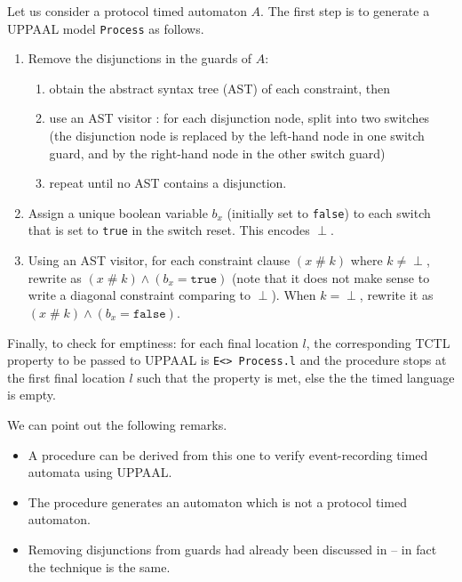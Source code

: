 \begin{procedure}
Let us consider a protocol timed automaton $A$. The first step is to generate a UPPAAL model \texttt{Process} as follows.
\begin{enumerate}

	\item Remove the disjunctions in the guards of $A$:
	\begin{enumerate}
		\item obtain the abstract syntax tree (AST) of each constraint, then
		\item use an AST visitor \cite{Gamma95}: for each disjunction node, split into two switches (the disjunction node is replaced by the left-hand node in one switch guard, and by the right-hand node in the other switch guard)
		\item repeat until no AST contains a disjunction.
	\end{enumerate}
	
	\item Assign a unique boolean variable $b_x$ (initially set to \texttt{false}) to each switch that is set to \texttt{true} in the switch reset. This encodes $\perp$.
	
	\item Using an AST visitor, for each constraint clause $(x \;\#\; k)$ where $k \neq \perp$, rewrite as $(x \;\#\; k) \wedge (b_x = \mathtt{true})$ (note that it does not make sense to write a diagonal constraint comparing to $\perp$). When $k = \perp$, rewrite it as $(x \;\#\; k) \wedge (b_x = \mathtt{false})$.

\end{enumerate}

Finally, to check for emptiness: for each final location $l$, the corresponding TCTL property to be passed to UPPAAL is \texttt{E<> Process.l} and the procedure stops at the first final location $l$ such that the property is met, else the the timed language is empty.
\label{proc:emptiness}
\end{procedure}

We can point out the following remarks.
\begin{itemize}
  \item A procedure can be derived from this one to verify event-recording timed automata using UPPAAL.
  \item The procedure generates an automaton which is not a protocol timed automaton.
  \item Removing disjunctions from guards had already been discussed in \cite{BBVD+99} -- in fact the technique is the same.
\end{itemize}

